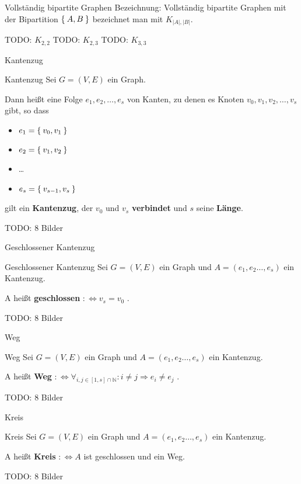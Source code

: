 \begin{frame}{Vollständig bipartite Graphen}
Bezeichnung: Vollständig bipartite Graphen mit der Bipartition $\Set{A, B}$ 
bezeichnet man mit $K_{|A|, |B|}$.

TODO: $K_{2,2}$
TODO: $K_{2,3}$
TODO: $K_{3,3}$
\end{frame}

\begin{frame}{Kantenzug}
\begin{block}{Kantenzug}
Sei $G = (V, E)$ ein Graph.

Dann heißt eine Folge $e_1, e_2, \dots, e_s$ von Kanten, zu denen es Knoten
$v_0, v_1, v_2, \dots, v_s$ gibt, so dass
\begin{itemize}
    \item $e_1 = \Set{v_0, v_1}$
    \item $e_2 = \Set{v_1, v_2}$
    \item \dots
    \item $e_s = \Set{v_{s-1}, v_s}$
\end{itemize}
gilt ein \textbf{Kantenzug}, der $v_0$ und $v_s$ \textbf{verbindet} und $s$ 
seine \textbf{Länge}.
\end{block}

TODO: 8 Bilder
\end{frame}

\begin{frame}{Geschlossener Kantenzug}
\begin{block}{Geschlossener Kantenzug}
Sei $G = (V, E)$ ein Graph und $A = (e_1, e_2 \dots, e_s)$ ein Kantenzug.

A heißt \textbf{geschlossen} $:\Leftrightarrow v_s = v_0$ .
\end{block}

TODO: 8 Bilder
\end{frame}

\begin{frame}{Weg}
\begin{block}{Weg}
Sei $G = (V, E)$ ein Graph und $A = (e_1, e_2 \dots, e_s)$ ein Kantenzug.

A heißt \textbf{Weg} $:\Leftrightarrow \forall_{i, j \in [1, s] \cap \mathbb{N}}: i \neq j \Rightarrow e_i \neq e_j$ .
\end{block}

TODO: 8 Bilder
\end{frame}

\begin{frame}{Kreis}
\begin{block}{Kreis}
Sei $G = (V, E)$ ein Graph und $A = (e_1, e_2 \dots, e_s)$ ein Kantenzug.

A heißt \textbf{Kreis} $:\Leftrightarrow A$ ist geschlossen und ein Weg.
\end{block}

TODO: 8 Bilder
\end{frame}

